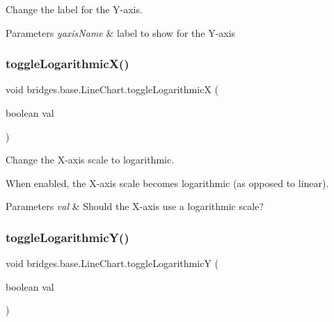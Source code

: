 Change the label for the Y-\/axis. 


\begin{DoxyParams}{Parameters}
{\em yaxis\+Name} & label to show for the Y-\/axis \\
\hline
\end{DoxyParams}
\mbox{\label{classbridges_1_1base_1_1_line_chart_ad3e5e54c382ac605a81b6b61c250ad16}} 
\subsubsection{\texorpdfstring{toggle\+Logarithmic\+X()}{toggleLogarithmicX()}}
{\footnotesize\ttfamily void bridges.\+base.\+Line\+Chart.\+toggle\+LogarithmicX (\begin{DoxyParamCaption}\item[{boolean}]{val }\end{DoxyParamCaption})}



Change the X-\/axis scale to logarithmic. 

When enabled, the X-\/axis scale becomes logarithmic (as opposed to linear).


\begin{DoxyParams}{Parameters}
{\em val} & Should the X-\/axis use a logarithmic scale? \\
\hline
\end{DoxyParams}
\mbox{\label{classbridges_1_1base_1_1_line_chart_a7946f217a7b3567ee1a1bd8266ed43ca}} 
\subsubsection{\texorpdfstring{toggle\+Logarithmic\+Y()}{toggleLogarithmicY()}}
{\footnotesize\ttfamily void bridges.\+base.\+Line\+Chart.\+toggle\+LogarithmicY (\begin{DoxyParamCaption}\item[{boolean}]{val }\end{DoxyParamCaption})}



